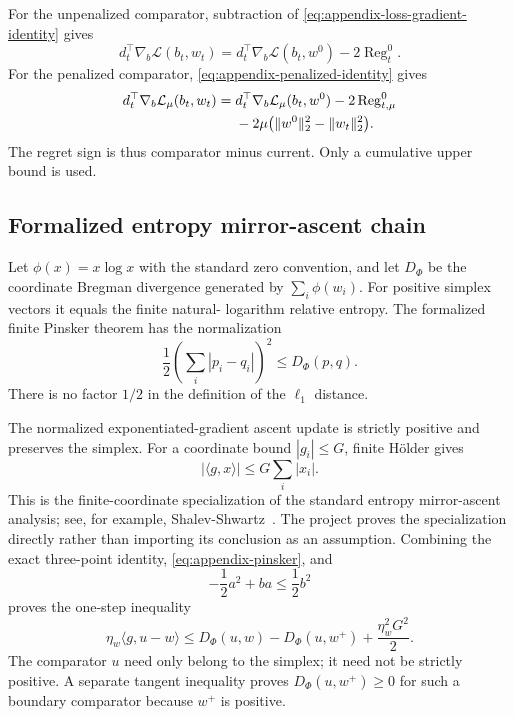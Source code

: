 For the unpenalized comparator, subtraction of
\eqref{eq:appendix-loss-gradient-identity} gives
\begin{equation}
  d_t^\top\nabla_b\mathcal L(b_t,w_t)
  =d_t^\top\nabla_b\mathcal L(b_t,w^0)
   -2\operatorname{Reg}_t^0.
  \label{eq:appendix-unpenalized-comparator}
\end{equation}
For the penalized comparator,
\eqref{eq:appendix-penalized-identity} gives
\begin{align}
  d_t^\top\nabla_b\mathcal L_\mu(b_t,w_t)
  ={}&d_t^\top\nabla_b\mathcal L_\mu(b_t,w^0)
      -2\operatorname{Reg}_{t,\mu}^0\notag\\
     &-2\mu\bigl(\|w^0\|_2^2-\|w_t\|_2^2\bigr).
  \label{eq:appendix-penalized-comparator}
\end{align}
The regret sign is thus comparator minus current.  Only a cumulative upper
bound is used.

\subsection{Formalized entropy mirror-ascent chain}

Let $\phi(x)=x\log x$ with the standard zero convention, and let $D_\Phi$ be
the coordinate Bregman divergence generated by
$\sum_i\phi(w_i)$.  For positive simplex vectors it equals the finite natural-
logarithm relative entropy.  The formalized finite Pinsker theorem has the
normalization
\begin{equation}
  \frac12\left(\sum_i|p_i-q_i|\right)^2\le D_\Phi(p,q).
  \label{eq:appendix-pinsker}
\end{equation}
There is no factor $1/2$ in the definition of the $\ell_1$ distance.

The normalized exponentiated-gradient ascent update is strictly positive and
preserves the simplex.  For a coordinate bound $|g_i|\le G$, finite H\"older
gives
\[
  |\langle g,x\rangle|\le G\sum_i|x_i|.
\]
This is the finite-coordinate specialization of the standard entropy
mirror-ascent analysis; see, for example, Shalev-Shwartz~\cite{online-learning}.
The project proves the specialization directly rather than importing its
conclusion as an assumption.
Combining the exact three-point identity, \eqref{eq:appendix-pinsker}, and
\[
  -\frac12a^2+ba\le\frac12b^2
\]
proves the one-step inequality
\begin{equation}
  \eta_w\langle g,u-w\rangle
  \le
  D_\Phi(u,w)-D_\Phi(u,w^+)
  +\frac{\eta_w^2G^2}{2}.
  \label{eq:appendix-mirror-one-step}
\end{equation}
The comparator $u$ need only belong to the simplex; it need not be strictly
positive.  A separate tangent inequality proves
$D_\Phi(u,w^+)\ge0$ for such a boundary comparator because $w^+$ is positive.

